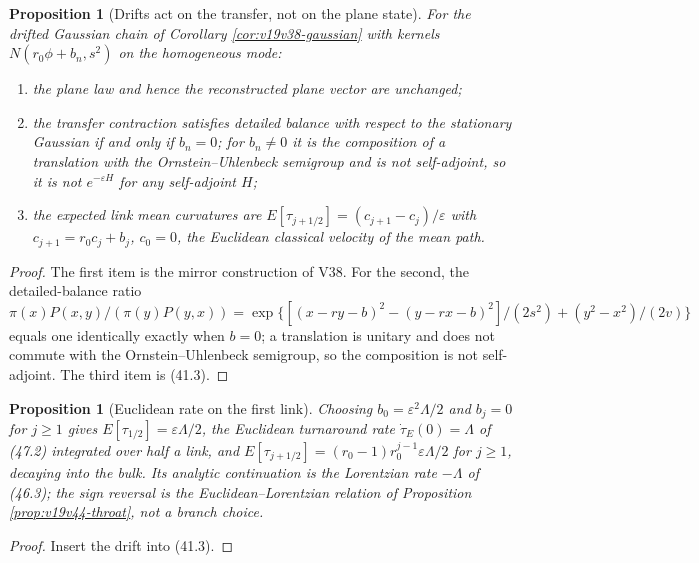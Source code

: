 \documentclass[11pt]{article}
\newtheorem{proposition}[theorem]{Proposition}
\theoremstyle{remark}
\begin{document}
\begin{proposition}[Drifts act on the transfer, not on the plane state]
\label{prop:v19v63-drift}
For the drifted Gaussian chain of Corollary \ref{cor:v19v38-gaussian}
with kernels \(N(r_0\phi+b_n,s^2)\) on the homogeneous mode:
\begin{enumerate}
\item the plane law and hence the reconstructed plane vector are
      unchanged;
\item the transfer contraction satisfies detailed balance with respect
      to the stationary Gaussian if and only if \(b_n=0\); for
      \(b_n\neq0\) it is the composition of a translation with the
      Ornstein--Uhlenbeck semigroup and is not self-adjoint, so it is
      not \(e^{-\varepsilon H}\) for any self-adjoint \(H\);
\item the expected link mean curvatures are
      \(E[\tau_{j+1/2}]=(c_{j+1}-c_j)/\varepsilon\) with
      \(c_{j+1}=r_0c_j+b_j\), \(c_0=0\), the Euclidean classical
      velocity of the mean path.
\end{enumerate}
\end{proposition}

\begin{proof}
The first item is the mirror construction of V38.  For the second,
the detailed-balance ratio
\(\pi(x)P(x,y)/(\pi(y)P(y,x))=\exp\{[(x-ry-b)^2-(y-rx-b)^2]/(2s^2)+(y^2-x^2)/(2v)\}\)
equals one identically exactly when \(b=0\); a translation is unitary
and does not commute with the Ornstein--Uhlenbeck semigroup, so the
composition is not self-adjoint.  The third item is (41.3).
\end{proof}

\begin{proposition}[Euclidean rate on the first link]
\label{prop:v19v63-rate}
Choosing \(b_0=\varepsilon^2\Lambda/2\) and \(b_j=0\) for \(j\geq1\)
gives \(E[\tau_{1/2}]=\varepsilon\Lambda/2\), the Euclidean turnaround
rate \(\dot\tau_E(0)=\Lambda\) of (47.2) integrated over half a link,
and \(E[\tau_{j+1/2}]=(r_0-1)r_0^{j-1}\varepsilon\Lambda/2\) for
\(j\geq1\), decaying into the bulk.  Its analytic continuation is the
Lorentzian rate \(-\Lambda\) of (46.3); the sign reversal is the
Euclidean--Lorentzian relation of Proposition \ref{prop:v19v44-throat},
not a branch choice.
\end{proposition}

\begin{proof}
Insert the drift into (41.3).
\end{proof}
\end{document}
